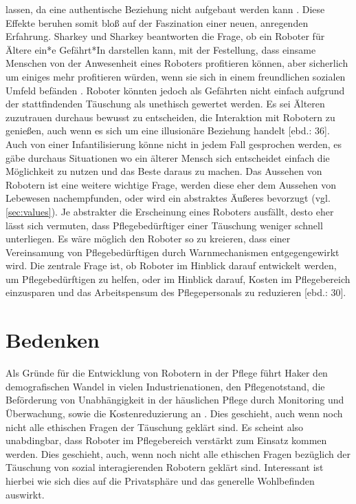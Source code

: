 lassen, da eine authentische Beziehung nicht aufgebaut werden kann \cite[149]{sparrow}. Diese Effekte beruhen somit bloß auf der Faszination einer neuen, anregenden Erfahrung. Sharkey und Sharkey beantworten die Frage, ob ein Roboter für Ältere ein*e Gefährt*In darstellen kann, mit der Festellung, dass einsame Menschen von der Anwesenheit eines Roboters profitieren können, aber sicherlich um einiges mehr profitieren würden, wenn sie sich in einem freundlichen sozialen Umfeld befänden \cite[34]{sharky}. Roboter könnten jedoch als Gefährten nicht einfach aufgrund der stattfindenden Täuschung als unethisch gewertet werden. Es sei Älteren zuzutrauen durchaus bewusst zu entscheiden, die Interaktion mit Robotern zu genießen, auch wenn es sich um eine illusionäre Beziehung handelt [ebd.: 36]. Auch von einer Infantilisierung könne nicht in jedem Fall gesprochen werden, es gäbe durchaus Situationen wo ein älterer Mensch sich entscheidet einfach die Möglichkeit zu nutzen und das Beste daraus zu machen. Das Aussehen von Robotern ist eine weitere wichtige Frage, werden diese eher dem Aussehen von Lebewesen nachempfunden, oder wird ein abstraktes Äußeres bevorzugt (vgl. \ref{sec:values}). Je abstrakter die Erscheinung eines Roboters ausfällt, desto eher lässt sich vermuten, dass Pflegebedürftiger einer Täuschung weniger schnell unterliegen. Es wäre möglich den Roboter so zu kreieren, dass einer Vereinsamung von Pflegebedürftigen durch Warnmechanismen entgegengewirkt wird. Die zentrale Frage ist, ob Roboter im Hinblick darauf entwickelt werden, um Pflegebedürftigen zu helfen, oder im Hinblick darauf, Kosten im Pflegebereich einzusparen und das Arbeitspensum des Pflegepersonals zu reduzieren [ebd.: 30].
\chapter{Bedenken}
Als Gründe für die Entwicklung von Robotern in der Pflege führt Haker den demografischen Wandel in vielen Industrienationen, den Pflegenotstand, die Beförderung von Unabhängigkeit in der häuslichen Pflege durch Monitoring und Überwachung, sowie die Kostenreduzierung an \cite[56]{haker}. Dies geschieht, auch wenn noch nicht alle ethischen Fragen der Täuschung geklärt sind. Es scheint also unabdingbar, dass Roboter im Pflegebereich verstärkt zum Einsatz kommen werden. Dies geschieht, auch, wenn noch nicht alle ethischen Fragen bezüglich der Täuschung von sozial interagierenden Robotern geklärt sind. Interessant ist hierbei wie sich dies auf die Privatsphäre und das generelle Wohlbefinden auswirkt.
